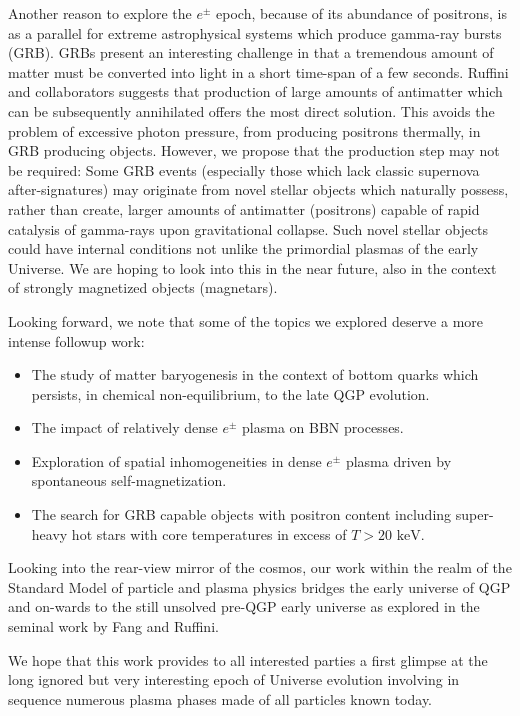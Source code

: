 \documentclass[universe,article,submit,moreauthors,pdftex,a4paper]{Definitions/mdpi}
\newcommand{\keV}{\text{ keV}}
\begin{document}
Another reason to explore the $e^{\pm}$ epoch, because of its abundance of positrons, is as a parallel for extreme astrophysical systems which produce gamma-ray bursts (GRB). GRBs present an interesting challenge in that a tremendous amount of matter must be converted into light in a short time-span of a few seconds. Ruffini and collaborators \cite{Ruffini:2001fe,Ruffini:2003yt,Ruffini:2009hg,Aksenov:2008zz,Ruffini:2012it,Han:2011er} suggests that  production of large amounts of antimatter which can be subsequently annihilated offers the most direct solution. This avoids the problem of excessive photon pressure, from producing positrons thermally, in GRB producing objects. However, we propose that the production step may  not be required: Some GRB events (especially those which lack classic supernova after-signatures) \cite{Burns:2023oxn,Levan:2023doz} may originate from novel stellar objects which naturally possess, rather than create, larger amounts of antimatter (positrons) capable of rapid catalysis of gamma-rays upon gravitational collapse. Such novel stellar objects could have internal conditions not unlike the primordial plasmas of the early Universe. We are hoping to look into this in the near future, also in the context of strongly magnetized objects (magnetars).

Looking forward, we note that some of the topics we explored deserve a more intense followup work: 
\begin{itemize}
\item The study of matter baryogenesis 
in the context of bottom quarks which persists, in chemical non-equilibrium, to the late QGP evolution.
\item The impact of relatively dense $e^{\pm}$ plasma on BBN processes.
\item Exploration of spatial inhomogeneities in dense $e^{\pm}$ plasma driven by spontaneous self-magnetization.
\item The search for GRB capable objects with positron content including super-heavy hot stars with core temperatures in excess of $T>20\keV$.
\end{itemize}

Looking into the rear-view mirror of the cosmos, our work within the realm of the Standard Model of particle and plasma physics bridges the early universe of QGP and on-wards to the still unsolved pre-QGP early universe as explored in the seminal work by Fang and Ruffini.

We hope that this work provides to all interested parties a first glimpse at the long ignored but very interesting epoch of Universe evolution involving in sequence numerous plasma phases made of all particles known today. 
\end{document}
